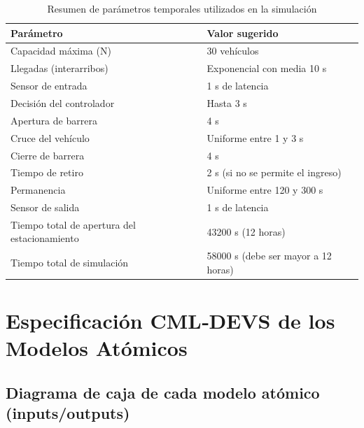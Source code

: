 \documentclass[12pt]{article}
\begin{document}
\begin{table}[h!]
\centering
\renewcommand{\arraystretch}{1.2}
\begin{tabular}{|l|l|}
\hline
\textbf{Parámetro}              & \textbf{Valor sugerido}                                \\ \hline
Capacidad máxima (N)           & 30 vehículos                                           \\ \hline
Llegadas (interarribos)        & Exponencial con media 10 s                             \\ \hline
Sensor de entrada              & 1 s de latencia                                        \\ \hline
Decisión del controlador       & Hasta 3 s                                              \\ \hline
Apertura de barrera            & 4 s                                                    \\ \hline
Cruce del vehículo             & Uniforme entre 1 y 3 s                                 \\ \hline
Cierre de barrera              & 4 s                                                    \\ \hline
Tiempo de retiro               & 2 s (si no se permite el ingreso)                      \\ \hline
Permanencia                    & Uniforme entre 120 y 300 s                             \\ \hline
Sensor de salida               & 1 s de latencia                                        \\ \hline
Tiempo total de apertura del estacionamiento  & 43200 s (12 horas)                      \\ \hline
Tiempo total de simulación     & 58000 s (debe ser mayor a 12 horas)                    \\ \hline
\end{tabular}
\caption{Resumen de parámetros temporales utilizados en la simulación}
\label{tab:resumen-parametros}
\end{table}

\clearpage

\section{Especificación CML‑DEVS de los Modelos Atómicos}

\subsection{Diagrama de caja de cada modelo atómico (inputs/outputs)}
\end{document}
